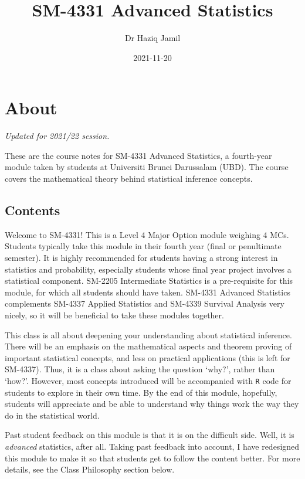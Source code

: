 \documentclass[
]{book}
\title{SM-4331 Advanced Statistics}
\author{Dr Haziq Jamil}
\date{2021-11-20}
\theoremstyle{definition}
\theoremstyle{definition}
\theoremstyle{definition}
\theoremstyle{definition}
\theoremstyle{remark}
\begin{document}
\maketitle

{
\setcounter{tocdepth}{1}
\tableofcontents
}
\hypertarget{about}{%
\chapter*{About}\label{about}}

\emph{Updated for 2021/22 session.}

These are the course notes for SM-4331 Advanced Statistics, a fourth-year module taken by students at Universiti Brunei Darussalam (UBD).
The course covers the mathematical theory behind statistical inference concepts.

\hypertarget{contents}{%
\section*{Contents}\label{contents}}

Welcome to SM-4331!
This is a Level 4 Major Option module weighing 4 MCs.
Students typically take this module in their fourth year (final or penultimate semester).
It is highly recommended for students having a strong interest in statistics and probability, especially students whose final year project involves a statistical component.
SM-2205 Intermediate Statistics is a pre-requisite for this module, for which all students should have taken.
SM-4331 Advanced Statistics complements SM-4337 Applied Statistics and SM-4339 Survival Analysis very nicely, so it will be beneficial to take these modules together.

This class is all about deepening your understanding about statistical inference.
There will be an emphasis on the mathematical aspects and theorem proving of important statistical concepts, and less on practical applications (this is left for SM-4337).
Thus, it is a class about asking the question `why?', rather than `how?'.
However, most concepts introduced will be accompanied with \texttt{R} code for students to explore in their own time.
By the end of this module, hopefully, students will appreciate and be able to understand why things work the way they do in the statistical world.

Past student feedback on this module is that it is on the difficult side.
Well, it is \emph{advanced} statistics, after all.
Taking past feedback into account, I have redesigned this module to make it so that students get to follow the content better.
For more details, see the Class Philosophy section below.
\end{document}

